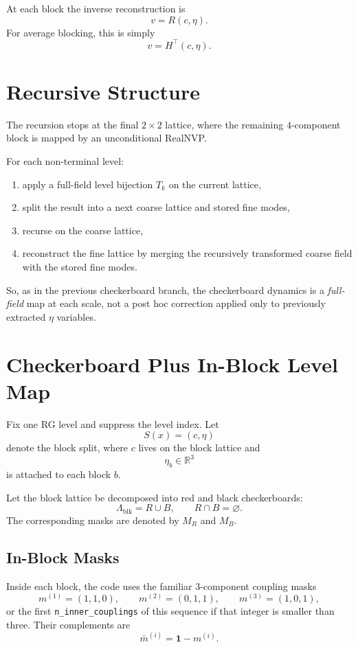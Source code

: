 \documentclass[11pt]{article}
\begin{document}
At each block the inverse reconstruction is
\[
v = R(c,\eta).
\]
For average blocking, this is simply
\[
v = H^\top(c,\eta).
\]

\section{Recursive Structure}

The recursion stops at the final $2\times 2$ lattice, where the remaining
$4$-component block is mapped by an unconditional RealNVP.

For each non-terminal level:
\begin{enumerate}
\item apply a full-field level bijection $T_k$ on the current lattice,
\item split the result into a next coarse lattice and stored fine modes,
\item recurse on the coarse lattice,
\item reconstruct the fine lattice by merging the recursively transformed
coarse field with the stored fine modes.
\end{enumerate}

So, as in the previous checkerboard branch, the checkerboard dynamics is a
\emph{full-field} map at each scale, not a post hoc correction applied only to
previously extracted $\eta$ variables.

\section{Checkerboard Plus In-Block Level Map}

Fix one RG level and suppress the level index. Let
\[
S(x) = (c,\eta)
\]
denote the block split, where $c$ lives on the block lattice and
\[
\eta_b\in\mathbb{R}^3
\]
is attached to each block $b$.

Let the block lattice be decomposed into red and black checkerboards:
\[
\Lambda_{\mathrm{blk}} = R \cup B,\qquad R\cap B = \varnothing.
\]
The corresponding masks are denoted by $M_R$ and $M_B$.

\subsection{In-Block Masks}

Inside each block, the code uses the familiar $3$-component coupling masks
\[
m^{(1)}=(1,1,0),\qquad
m^{(2)}=(0,1,1),\qquad
m^{(3)}=(1,0,1),
\]
or the first \texttt{n\_inner\_couplings} of this sequence if that integer is
smaller than three. Their complements are
\[
\bar m^{(i)} = \mathbf 1 - m^{(i)}.
\]
\end{document}
